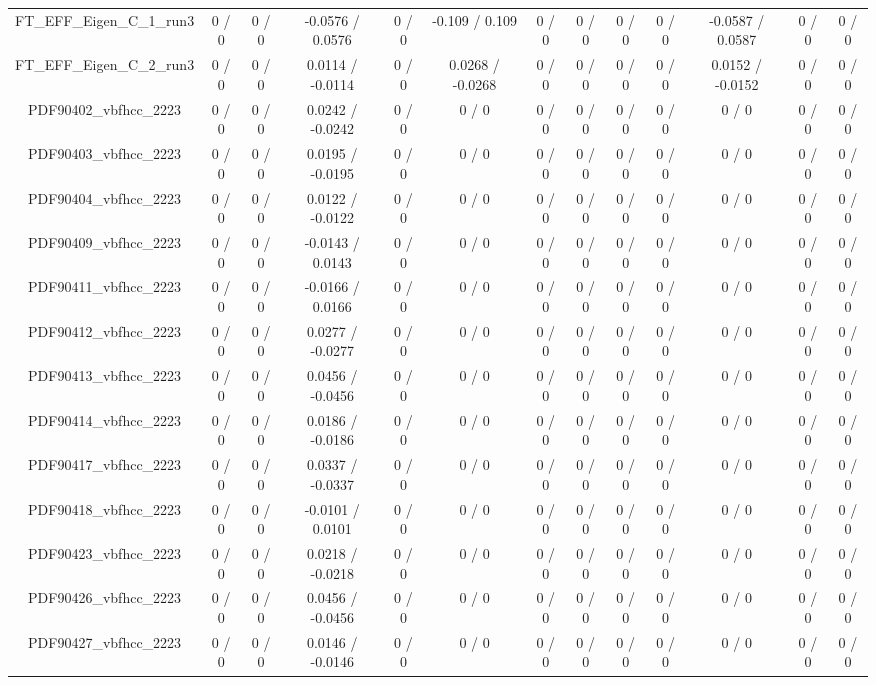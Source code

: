 \documentclass[10pt]{article}
\begin{document}
\begin{table}[htbp]
\begin{center}
\begin{tabular}{|c|c|c|c|c|c|c|c|c|c|c|c|c|}
  FT_EFF_Eigen_C_1_run3 & 0 / 0 & 0 / 0 & -0.0576 / 0.0576 & 0 / 0 & -0.109 / 0.109 & 0 / 0 & 0 / 0 & 0 / 0 & 0 / 0 & -0.0587 / 0.0587 & 0 / 0 & 0 / 0 \\ 
  FT_EFF_Eigen_C_2_run3 & 0 / 0 & 0 / 0 & 0.0114 / -0.0114 & 0 / 0 & 0.0268 / -0.0268 & 0 / 0 & 0 / 0 & 0 / 0 & 0 / 0 & 0.0152 / -0.0152 & 0 / 0 & 0 / 0 \\ 
  PDF90402_vbfhcc_2223 & 0 / 0 & 0 / 0 & 0.0242 / -0.0242 & 0 / 0 & 0 / 0 & 0 / 0 & 0 / 0 & 0 / 0 & 0 / 0 & 0 / 0 & 0 / 0 & 0 / 0 \\ 
  PDF90403_vbfhcc_2223 & 0 / 0 & 0 / 0 & 0.0195 / -0.0195 & 0 / 0 & 0 / 0 & 0 / 0 & 0 / 0 & 0 / 0 & 0 / 0 & 0 / 0 & 0 / 0 & 0 / 0 \\ 
  PDF90404_vbfhcc_2223 & 0 / 0 & 0 / 0 & 0.0122 / -0.0122 & 0 / 0 & 0 / 0 & 0 / 0 & 0 / 0 & 0 / 0 & 0 / 0 & 0 / 0 & 0 / 0 & 0 / 0 \\ 
  PDF90409_vbfhcc_2223 & 0 / 0 & 0 / 0 & -0.0143 / 0.0143 & 0 / 0 & 0 / 0 & 0 / 0 & 0 / 0 & 0 / 0 & 0 / 0 & 0 / 0 & 0 / 0 & 0 / 0 \\ 
  PDF90411_vbfhcc_2223 & 0 / 0 & 0 / 0 & -0.0166 / 0.0166 & 0 / 0 & 0 / 0 & 0 / 0 & 0 / 0 & 0 / 0 & 0 / 0 & 0 / 0 & 0 / 0 & 0 / 0 \\ 
  PDF90412_vbfhcc_2223 & 0 / 0 & 0 / 0 & 0.0277 / -0.0277 & 0 / 0 & 0 / 0 & 0 / 0 & 0 / 0 & 0 / 0 & 0 / 0 & 0 / 0 & 0 / 0 & 0 / 0 \\ 
  PDF90413_vbfhcc_2223 & 0 / 0 & 0 / 0 & 0.0456 / -0.0456 & 0 / 0 & 0 / 0 & 0 / 0 & 0 / 0 & 0 / 0 & 0 / 0 & 0 / 0 & 0 / 0 & 0 / 0 \\ 
  PDF90414_vbfhcc_2223 & 0 / 0 & 0 / 0 & 0.0186 / -0.0186 & 0 / 0 & 0 / 0 & 0 / 0 & 0 / 0 & 0 / 0 & 0 / 0 & 0 / 0 & 0 / 0 & 0 / 0 \\ 
  PDF90417_vbfhcc_2223 & 0 / 0 & 0 / 0 & 0.0337 / -0.0337 & 0 / 0 & 0 / 0 & 0 / 0 & 0 / 0 & 0 / 0 & 0 / 0 & 0 / 0 & 0 / 0 & 0 / 0 \\ 
  PDF90418_vbfhcc_2223 & 0 / 0 & 0 / 0 & -0.0101 / 0.0101 & 0 / 0 & 0 / 0 & 0 / 0 & 0 / 0 & 0 / 0 & 0 / 0 & 0 / 0 & 0 / 0 & 0 / 0 \\ 
  PDF90423_vbfhcc_2223 & 0 / 0 & 0 / 0 & 0.0218 / -0.0218 & 0 / 0 & 0 / 0 & 0 / 0 & 0 / 0 & 0 / 0 & 0 / 0 & 0 / 0 & 0 / 0 & 0 / 0 \\ 
  PDF90426_vbfhcc_2223 & 0 / 0 & 0 / 0 & 0.0456 / -0.0456 & 0 / 0 & 0 / 0 & 0 / 0 & 0 / 0 & 0 / 0 & 0 / 0 & 0 / 0 & 0 / 0 & 0 / 0 \\ 
  PDF90427_vbfhcc_2223 & 0 / 0 & 0 / 0 & 0.0146 / -0.0146 & 0 / 0 & 0 / 0 & 0 / 0 & 0 / 0 & 0 / 0 & 0 / 0 & 0 / 0 & 0 / 0 & 0 / 0 \\ 

\end{tabular}
\end{center}
\end{table}
\end{document}
